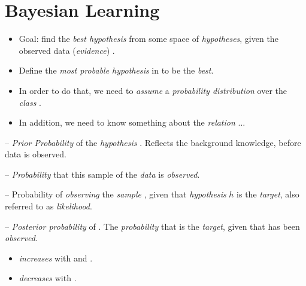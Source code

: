\documentclass[
	title={Na\:ive Bayes Learning}
]{cs584notes}
\begin{document}
\section{Bayesian Learning}\label{sec:bayesian-learning}
\begin{itemize}
	\item Goal: find the \emph{best hypothesis} from some space  of \emph{hypotheses}, given the observed data (\emph{evidence}) .
	\item Define the \emph{most probable hypothesis} in  to be the \emph{best}.
	\item In order to do that, we need to \emph{assume} a \emph{probability distribution} over the \emph{class} .
	\item In addition, we need to know something about the \emph{relation} $\dots$
\end{itemize}

\begin{description}[font=\color{red}]
	\item[$P(h)$] -- \emph{Prior Probability} of the \emph{hypothesis} . Reflects the background knowledge, before data is observed.
	\item[$P(D)$] -- \emph{Probability} that this sample of the \emph{data} is \emph{observed}.
	\item[$P(D|h)$] -- {Probability} of \emph{observing} the \emph{sample} , given that \emph{hypothesis} $h$ is the \emph{target}, also referred to as \emph{likelihood}.
	\item[$P(h|D)$] -- \emph{Posterior probability} of . The \emph{probability} that  is the \emph{target}, given that  has been \emph{observed}.
\end{description}

\begin{itemize}
	\item {} \emph{increases} with  and .
	\item {} \emph{decreases} with .
\end{itemize}
\end{document}

